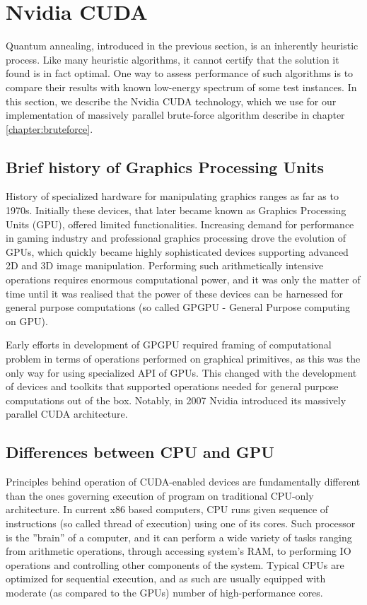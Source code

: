 \section{Nvidia CUDA}

Quantum annealing, introduced in the previous section, is an inherently heuristic process. Like many heuristic algorithms, it cannot certify that the solution it found is in fact optimal. One way to assess performance of such algorithms is to compare their results with known low-energy spectrum of some test instances. In this section, we describe the Nvidia CUDA technology, which we use for our implementation of massively parallel brute-force algorithm describe in chapter \ref{chapter:bruteforce}.

\subsection{Brief history of Graphics Processing Units}
History of specialized hardware for manipulating graphics ranges as far as to 1970s. Initially these devices, that later became known as Graphics Processing Units (GPU), offered limited functionalities. Increasing demand for performance in gaming industry and professional graphics processing drove the evolution of GPUs, which quickly became highly sophisticated devices supporting advanced 2D and 3D image manipulation. Performing such arithmetically intensive operations requires enormous computational power, and it was only the matter of time until it was realised that the power of these devices can be harnessed for general purpose computations (so called GPGPU - General Purpose computing on GPU). 

Early efforts in development of GPGPU required framing of computational problem in terms of operations performed on graphical primitives, as this was the only way for using specialized API of GPUs. This changed with the development of devices and toolkits that supported operations needed for general purpose computations out of the box. Notably, in 2007 Nvidia introduced its massively parallel CUDA architecture.

\subsection{Differences between CPU and GPU}
Principles behind operation of CUDA-enabled devices are fundamentally different than the ones governing execution of program on traditional CPU-only architecture. In current x86 based computers, CPU runs given sequence of instructions (so called thread of execution) using one of its cores. Such processor is the ''brain'' of a computer, and it can perform a wide variety of tasks ranging from arithmetic operations, through accessing system's RAM, to performing IO operations and controlling other components of the system. Typical CPUs are optimized for sequential execution, and as such are usually equipped with moderate (as compared to the GPUs) number of high-performance cores. 

